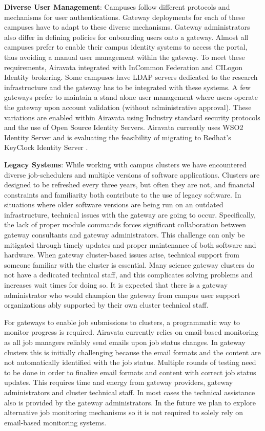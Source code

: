 \documentclass[sigconf]{acmart}
\begin{document}
\noindent\textbf{Diverse User Management}: Campuses follow different protocols and mechanisms for user authentications. Gateway deployments for each of these campuses have to adapt to these diverse mechanisms. Gateway administrators also differ in defining policies for onboarding users onto a gateway.  Almost all campuses prefer to enable their campus identity systems to access the portal, thus avoiding a manual user management within the gateway. To meet these requirements, Airavata integrated with InCommon Federation and CILogon Identity brokering. Some campuses have LDAP servers dedicated to the research infrastructure and the gateway has to be integrated with these systems.  A few gateways prefer to maintain  a stand alone user management where users operate the gateway upon account validation (without administrative approval). These variations are enabled within Airavata using Industry standard security protocols and the use of Open Source Identity Servers. Airavata currently uses WSO2 Identity Server \cite{wso2IS} and is evaluating the feasibility of  migrating to Redhat's KeyClock Identity Server \cite{keycloak}.

\noindent\textbf{Legacy Systems}: While working with campus clusters we have encountered diverse job-schedulers and multiple versions of software applications. Clusters are designed to be refreshed every three years, but often they are not, and financial constraints and familiarity both contribute to the use of legacy software. In situations where older software versions are being run on an outdated infrastructure, technical issues with the gateway are going to occur.  Specifically, the lack of proper module commands forces significant collaboration between gateway consultants and gateway administrators. This challenge can only be mitigated through timely updates and proper maintenance of both software and hardware.  When gateway cluster-based issues arise,  technical support from someone familiar with the cluster is essential. Many science gateway clusters do not have a dedicated technical staff, and this complicates solving problems and increases wait times for doing so. It is expected that there is a gateway administrator who would champion the gateway from campus user support organizations ably supported by their own cluster technical staff. 

For gateways to enable job submissions to clusters, a programmatic way to monitor progress is required. Airavata currently relies on email-based monitoring as all job managers reliably send emails upon job status changes. In gateway clusters this is initially challenging because the email formats and the content are not automatically identified with the job status. Multiple rounds of testing need to be done in order to finalize email formats and content with correct job status updates. This requires time and energy from gateway providers, gateway administrators and cluster technical staff. In most cases the technical assistance also is provided by the gateway administrators. In the future we plan to explore alternative job monitoring mechanisms so it is  not required to solely rely on email-based monitoring systems. 
\end{document}
